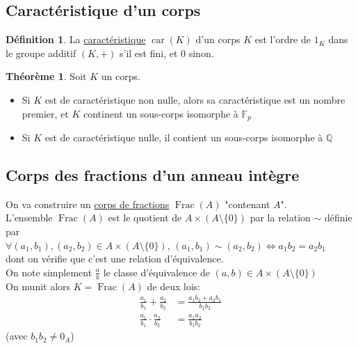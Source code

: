 \documentclass[10pt,a4paper]{article}
\theoremstyle{definition}
\newtheorem{theorem}[proposition]{Théorème}
\newtheorem{definition}[proposition]{Définition}
\DeclareMathOperator{\car}{car}
\DeclareMathOperator{\Frac}{Frac}
\begin{document}
\subsection{Caractéristique d'un corps}
\begin{definition}
La \uline{caractéristique} $\car(K)$ d'un corps $K$ est l'ordre de $1_K$ dans le groupe additif $(K, +)$ s'il est fini, et $0$ sinon.
\end{definition}
\begin{theorem}
Soit $K$ un corps.
\begin{itemize}
\item Si $K$ est de caractéristique non nulle, alors sa caractéristique est un nombre premier, et $K$ continent un sous-corps isomorphe à $\mathbb{F}_p$
\item Si $K$ est de caractéristique nulle, il contient un sous-corps isomorphe à $\mathbb{Q}$
\end{itemize}
\end{theorem}

\subsection{Corps des fractions d'un anneau intègre}
\noindent On va construire un \uline{corps de fractions} $\Frac(A)$ "contenant $A$". \\
L'ensemble $\Frac(A)$ est le quotient de $A \times (A \setminus \{ 0 \})$ par la relation $\sim$ définie par \\
$\forall (a_1, b_1),(a_2, b_2) \in A \times (A \setminus \{ 0 \})$, $(a_1, b_1) \sim (a_2, b_2) \iff a_1 b_2 = a_2 b_1$ \\
dont on vérifie que c'est une relation d'équivalence. \\
On note simplement $\frac{a}{b}$ le classe d'équivalence de $(a, b) \in A \times (A \setminus \{ 0 \})$ \\
On munit alors $K = \Frac(A)$ de deux lois:
\begin{align*}
\frac{a_1}{b_1} + \frac{a_2}{b_2} &= \frac{a_1 b_2 + a_2 b_1}{b_1 b_2} \\
\frac{a_1}{b_1} \cdot \frac{a_2}{b_2} &= \frac{a_1 a_2}{b_1 b_2}
\end{align*}
(avec $b_1 b_2 \neq 0_A$)
\end{document}
